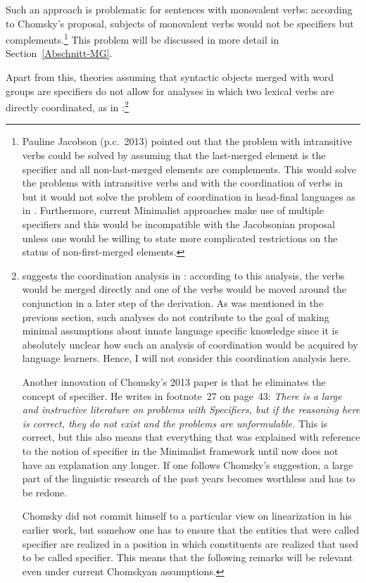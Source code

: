 Such an approach is problematic for sentences with monovalent verbs: according to Chomsky's
proposal, subjects of monovalent verbs would not be specifiers but complements.\footnote{%
  Pauline Jacobson (p.c.\ 2013) pointed out that the problem with intransitive verbs could be solved by assuming
  that the last-merged element is the specifier and all non-last-merged elements are
  complements. This would solve the problems with intransitive verbs and with the coordination of
  verbs in  but it would not solve the problem of
  coordination in head-final languages as in . Furthermore, current Minimalist approaches make use of
  multiple specifiers and this would be incompatible with the Jacobsonian proposal unless one would
  be willing to state more complicated restrictions on the status of non-first-merged elements.%
}
This problem will be discussed in more detail in Section~\ref{Abschnitt-MG}.\pagebreak

Apart from this, theories assuming that syntactic objects merged with word groups are specifiers do
not allow for analyses in which two lexical verbs are directly coordinated, as in :\footnote{\label{fn-Chomsky-on-Specifiers}%
  \citet[]{Chomsky2013a} suggests the coordination analysis in
  : according to this analysis, the verbs would
  be merged directly and one of the verbs would be moved around the conjunction in a later step of
  the derivation. As was mentioned in the previous section, such analyses do not contribute to the
  goal of making minimal assumptions about innate language specific knowledge since it is absolutely
  unclear how such an analysis of coordination would be acquired by language learners. Hence, I will
  not consider this coordination analysis here.

  Another innovation of Chomsky's 2013 paper is that he eliminates the concept of specifier. He
    writes in footnote~27 on page~43: \emph{There is a large and instructive literature on problems with
    Specifiers, but if the reasoning here is correct, they do not exist and the problems are
    unformulable.} This is correct, but this also means that everything that was explained with
    reference to the notion of specifier in the Minimalist framework until now does not have an explanation any longer.
    If one follows Chomsky's suggestion, a large part of the linguistic research of the past years
    becomes worthless and has to be redone.

    Chomsky did not commit himself to a particular view on linearization in his earlier work, but
  somehow one has to ensure that the entities that were called specifier are realized in a position
  in which constituents are realized that used to be called specifier. This means that the following
  remarks will be relevant even under current Chomskyan assumptions.
}


